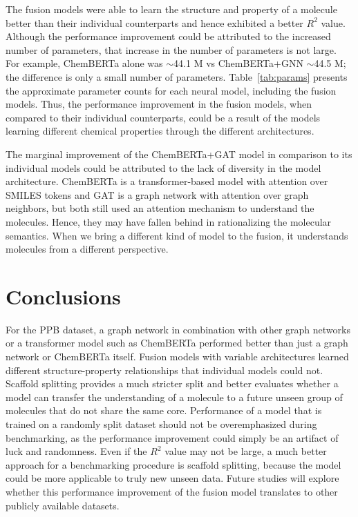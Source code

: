 \documentclass[11pt,a4paper]{article}
\begin{document}
The fusion models were able to learn the structure and property of a molecule better than their individual counterparts and hence exhibited a better $R^{2}$ value.
Although the performance improvement could be attributed to the increased number of parameters, that increase in the number of parameters is not large.
For example, ChemBERTa alone was $\sim$44.1 M vs ChemBERTa+GNN $\sim$44.5 M; the difference is only a small number of parameters.
Table~\ref{tab:params} presents the approximate parameter counts for each neural model, including the fusion models.
Thus, the performance improvement in the fusion models, when compared to their individual counterparts, could be a result of the models learning different chemical properties through the different architectures.

The marginal improvement of the ChemBERTa+GAT model in comparison to its individual models could be attributed to the lack of diversity in the model architecture.
ChemBERTa is a transformer-based model with attention over SMILES tokens and GAT is a graph network with attention over graph neighbors, but both still used an attention mechanism to understand the molecules.
Hence, they may have fallen behind in rationalizing the molecular semantics.
When we bring a different kind of model to the fusion, it understands molecules from a different perspective.

\section{Conclusions}

For the PPB dataset, a graph network in combination with other graph networks or a transformer model such as ChemBERTa performed better than just a graph network or ChemBERTa itself.
Fusion models with variable architectures learned different structure-property relationships that individual models could not.
Scaffold splitting provides a much stricter split and better evaluates whether a model can transfer the understanding of a molecule to a future unseen group of molecules that do not share the same core.
Performance of a model that is trained on a randomly split dataset should not be overemphasized during benchmarking, as the performance improvement could simply be an artifact of luck and randomness.
Even if the $R^{2}$ value may not be large, a much better approach for a benchmarking procedure is scaffold splitting, because the model could be more applicable to truly new unseen data.
Future studies will explore whether this performance improvement of the fusion model translates to other publicly available datasets.
\end{document}

